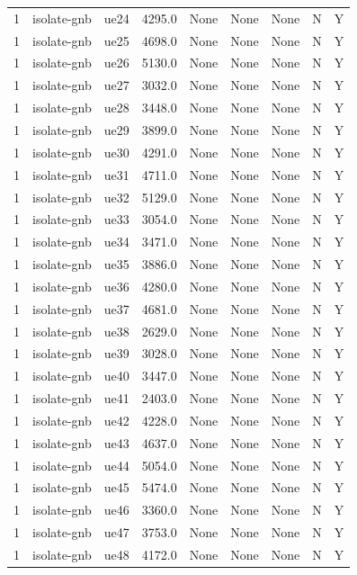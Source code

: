 \begin{table}[ht]
\begin{tabular}{|c|c|c|c|c|c|c|c|c|}
1 & isolate-gnb & ue24 & 4295.0 & None & None & None & N & Y \\
1 & isolate-gnb & ue25 & 4698.0 & None & None & None & N & Y \\
1 & isolate-gnb & ue26 & 5130.0 & None & None & None & N & Y \\
1 & isolate-gnb & ue27 & 3032.0 & None & None & None & N & Y \\
1 & isolate-gnb & ue28 & 3448.0 & None & None & None & N & Y \\
1 & isolate-gnb & ue29 & 3899.0 & None & None & None & N & Y \\
1 & isolate-gnb & ue30 & 4291.0 & None & None & None & N & Y \\
1 & isolate-gnb & ue31 & 4711.0 & None & None & None & N & Y \\
1 & isolate-gnb & ue32 & 5129.0 & None & None & None & N & Y \\
1 & isolate-gnb & ue33 & 3054.0 & None & None & None & N & Y \\
1 & isolate-gnb & ue34 & 3471.0 & None & None & None & N & Y \\
1 & isolate-gnb & ue35 & 3886.0 & None & None & None & N & Y \\
1 & isolate-gnb & ue36 & 4280.0 & None & None & None & N & Y \\
1 & isolate-gnb & ue37 & 4681.0 & None & None & None & N & Y \\
1 & isolate-gnb & ue38 & 2629.0 & None & None & None & N & Y \\
1 & isolate-gnb & ue39 & 3028.0 & None & None & None & N & Y \\
1 & isolate-gnb & ue40 & 3447.0 & None & None & None & N & Y \\
1 & isolate-gnb & ue41 & 2403.0 & None & None & None & N & Y \\
1 & isolate-gnb & ue42 & 4228.0 & None & None & None & N & Y \\
1 & isolate-gnb & ue43 & 4637.0 & None & None & None & N & Y \\
1 & isolate-gnb & ue44 & 5054.0 & None & None & None & N & Y \\
1 & isolate-gnb & ue45 & 5474.0 & None & None & None & N & Y \\
1 & isolate-gnb & ue46 & 3360.0 & None & None & None & N & Y \\
1 & isolate-gnb & ue47 & 3753.0 & None & None & None & N & Y \\
1 & isolate-gnb & ue48 & 4172.0 & None & None & None & N & Y \\

\end{tabular}
\end{table}
